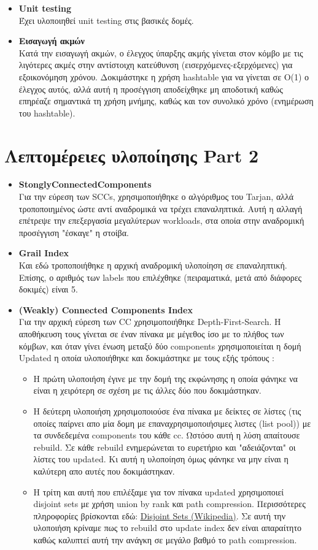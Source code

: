 \documentclass[11pt]{article}
\begin{document}
\begin{itemize}
\begin{itemize}
\end{itemize}
\item \textbf{Unit testing}\\ Έχει υλοποιηθεί unit testing στις βασικές δομές.
\item \textbf{Εισαγωγή ακμών}\\ Κατά την εισαγωγή ακμών, ο έλεγχος ύπαρξης ακμής γίνεται στον κόμβο με τις λιγότερες ακμές στην αντίστοιχη κατεύθυνση (εισερχόμενες-εξερχόμενες) για εξοικονόμηση χρόνου. Δοκιμάστηκε η χρήση hashtable για να γίνεται σε O(1) ο έλεγχος αυτός, αλλά αυτή η προσέγγιση αποδείχθηκε μη αποδοτική καθώς επηρέαζε σημαντικά τη χρήση μνήμης, καθώς και τον συνολικό χρόνο (ενημέρωση του hashtable).
\end{itemize}
\section{Λεπτομέρειες υλοποίησης Part 2}
\begin{itemize}
\item \textbf{StonglyConnectedComponents}\\
Για την εύρεση των SCCs, χρησιμοποιήθηκε ο αλγόριθμος του Tarjan, αλλά τροποποιημένος ώστε αντί αναδρομικά να τρέχει επαναληπτικά. Αυτή η αλλαγή επέτρεψε την επεξεργασία μεγαλύτερων workloads, στα οποία στην αναδρομική προσέγγιση "έσκαγε" η στοίβα.
\item \textbf{Grail Index}\\
Και εδώ τροποποιήθηκε η αρχική αναδρομική υλοποίηση σε επαναληπτική. Επίσης, ο αριθμός των labels που επιλέχθηκε (πειραματικά, μετά από διάφορες δοκιμές) είναι 5.
\item \textbf{(Weakly) Connected Components Index}\\
Για την αρχική εύρεση των CC χρησιμοποιήθηκε Depth-First-Search. Η αποθήκευση τους γίνεται σε έναν πίνακα με μέγεθος ίσο με το πλήθος των κόμβων, και όταν γίνει ένωση μεταξύ δύο components χρησιμοποιείται η δομή Updated η οποία υλοποιήθηκε και δοκιμάστηκε με τους εξής τρόπους :
\begin{itemize}
\item H πρώτη υλοποιήση έγινε με την δομή της εκφώνησης η οποία φάνηκε να είναι η χειρότερη σε σχέση με τις άλλες δύο που δοκιμάστηκαν.
\item Η δεύτερη υλοποιήση χρησιμοποιούσε ένα πίνακα με δείκτες σε λίστες (τις οποίες παίρνει απο μία δομη με επαναχρησιμοποιήσιμες λιστες (list pool)) με τα συνδεδεμένα components του κάθε cc. Ωστόσο αυτή η λύση απαίτουσε rebuild. Σε κάθε rebuild ενημερώνεται το ευρετήριο και "αδειάζονται" οι λίστες του updated. Κι αυτή η υλοποίηση όμως φάνηκε να μην είναι η καλύτερη απο αυτές που δοκιμάστηκαν.
\item Η τρίτη και αυτή που επιλέξαμε για τον πίνακα updated χρησιμοποιεί disjoint sets με χρήση union by rank και path compression. Περισσότερες πληροφορίες βρίσκονται εδώ: {\color{blue}\underline{\href{https://en.wikipedia.org/wiki/Disjoint-set\_data\_structure\#Union\_by\_rank}{Disjoint Sets (Wikipedia)}}}. Σε αυτή την υλοποιήση κρίναμε πως το rebuild στο update index δεν είναι απαραίτητο καθώς καλυπτεί αυτή την ανάγκη σε μεγάλο βαθμό το path compression.
\end{itemize}
\end{itemize}
\end{document}
